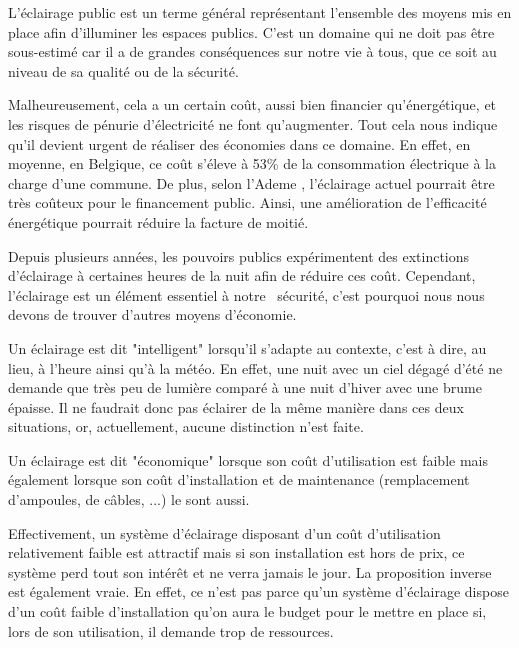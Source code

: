 

L'\'eclairage public est un terme g\'en\'eral repr\'esentant l'ensemble des moyens mis en place afin d'illuminer les espaces publics. C'est un domaine qui ne doit pas \^etre sous-estim\'e car il a de grandes cons\'equences sur notre vie \`a tous, que ce soit au niveau de sa qualit\'e ou de la s\'ecurit\'e. \cite{projwebsite}


Malheureusement, cela a un certain co\^ut, aussi bien financier qu'\'energ\'etique, et  les risques de p\'enurie d'\'electricit\'e ne font qu'augmenter. Tout cela nous indique qu'il devient urgent de r\'ealiser des \'economies dans ce domaine. En effet, en moyenne, en Belgique, ce co\^ut  s'\'eleve \`a 53\% de la consommation \'electrique \`a la charge d'une commune. De plus, selon l'Ademe \cite{ademe}, l'\'eclairage actuel pourrait \^etre tr\`es co\^uteux pour le financement public. Ainsi, une am\'elioration de l'efficacit\'e \'energ\'etique pourrait r\'eduire la facture de moiti\'e.


Depuis plusieurs ann\'ees, les pouvoirs publics exp\'erimentent des extinctions d'\'eclairage \`a certaines heures de la nuit afin de r\'eduire ces co\^ut. Cependant, l'\'eclairage est un élément essentiel \`a notre \ s\'ecurit\'e, c'est pourquoi nous nous devons de trouver d'autres moyens d'\'economie.

Un \'eclairage est dit "intelligent" lorsqu'il s'adapte au contexte, c'est à dire, au lieu, à l'heure ainsi qu'\`a la m\'et\'eo. En effet, une nuit avec un ciel d\'egag\'e d'\'et\'e ne demande que tr\`es peu de lumi\`ere comparé à une nuit d'hiver avec une brume \'epaisse. Il ne faudrait donc pas éclairer de la même manière dans ces deux situations, or, actuellement, aucune distinction n'est faite. 

Un \'eclairage est dit "\'economique" lorsque son co\^ut d'utilisation est faible mais également lorsque son co\^ut d'installation et de maintenance (remplacement d'ampoules, de c\^ables, ...) le sont aussi.

Effectivement, un système d'\'eclairage disposant d'un co\^ut d'utilisation relativement faible est attractif mais si son installation est hors de prix, ce système perd tout son intérêt et ne verra jamais le jour. La proposition inverse est également vraie. En effet, ce n'est pas parce qu'un système d'éclairage dispose d'un coût faible d'installation qu'on aura le budget pour le mettre en place si, lors de son utilisation, il demande trop de ressources.

